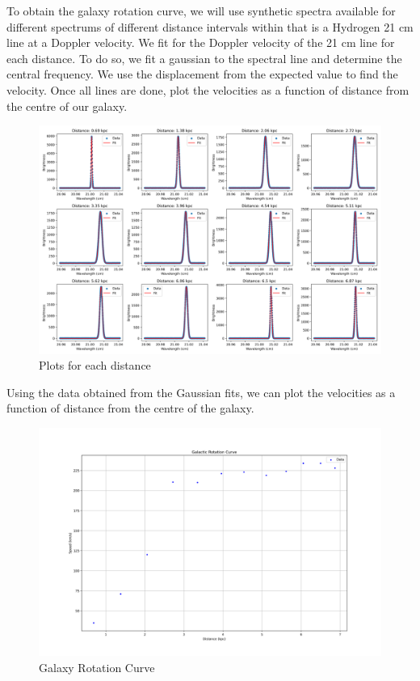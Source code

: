 To obtain the galaxy rotation curve, we will use synthetic spectra available for different spectrums of different distance intervals within that is a Hydrogen 21 cm line at a Doppler velocity. We fit for the Doppler velocity of the 21 cm line for each distance. To do so, we fit a gaussian to the spectral line and determine the central frequency. We use the displacement from the expected value to find the velocity. Once all lines are done, plot the velocities as a function of distance from the centre of our galaxy.

\begin{figure}[H]
	\centering
	\includegraphics[width=\textwidth]{Images/12_files.png}
	\caption{Plots for each distance}
	\label{fig:12_files}
\end{figure}

Using the data obtained from the Gaussian fits, we can plot the velocities as a function of distance from the centre of the galaxy. 

\begin{figure}[H]
	\centering
	\includegraphics[width=\textwidth]{Images/galaxy_rotation_curve.png}
	\caption{Galaxy Rotation Curve}
	\label{fig:galaxy_rotation_curve}
\end{figure}

